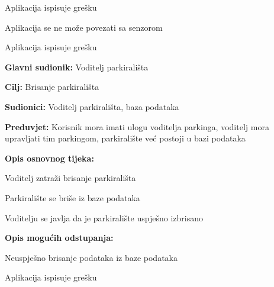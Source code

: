 \begin{packed_item}
\begin{packed_item}
\begin{packed_enum}
								\item Aplikacija ispisuje grešku
								
							\end{packed_enum}
							\item[4.a] Aplikacija se ne može povezati sa senzorom
							\item[] \begin{packed_enum}
								
								\item Aplikacija ispisuje grešku
								
							\end{packed_enum}
							
						\end{packed_item}
					\end{packed_item}
					\noindent {}
					\begin{packed_item}
						
						\item \textbf{Glavni sudionik: }Voditelj parkirališta
						\item  \textbf{Cilj:} Brisanje parkirališta
						\item  \textbf{Sudionici:} Voditelj parkirališta, baza podataka
						\item  \textbf{Preduvjet:} Korisnik mora imati ulogu voditelja parkinga, voditelj mora upravljati tim parkingom, parkiralište već postoji u bazi podataka
						\item  \textbf{Opis osnovnog tijeka:}
						
						\item[] \begin{packed_enum}
							
							
							\item Voditelj zatraži brisanje parkirališta
							\item Parkiralište se briše iz baze podataka
							\item Voditelju se javlja da je parkiralište uspješno izbrisano
							
						\end{packed_enum}
						
						\item  \textbf{Opis mogućih odstupanja:}
						
						\item[] \begin{packed_item}
							
							\item[2.a] Neuspješno brisanje podataka iz baze podataka	
							\item[] \begin{packed_enum}
								
								\item Aplikacija ispisuje grešku
								
							\end{packed_enum}
						\end{packed_item}
					\end{packed_item}
